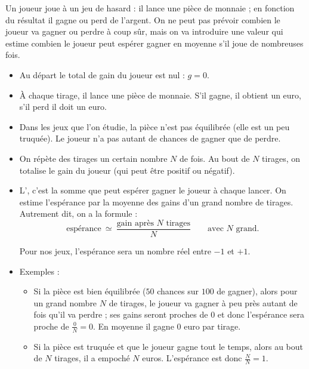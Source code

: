 \documentclass[11pt,class=report,crop=false]{standalone}
\begin{document}
\begin{cours}


Un joueur joue à un jeu de hasard : il lance une pièce de monnaie ; en fonction du résultat il gagne ou perd de l'argent. On ne peut pas prévoir combien le joueur va gagner ou perdre à coup sûr, mais on va introduire une valeur qui estime combien le joueur peut espérer gagner en moyenne s'il joue de nombreuses fois.

\begin{itemize}
  \item Au départ le total de gain du joueur est nul : $g=0$.
  
  \item À chaque tirage, il lance une pièce de monnaie. S'il gagne, il obtient un euro, s'il perd il doit un euro.
  
  \item Dans les jeux que l'on étudie, la pièce n'est pas équilibrée (elle est un peu truquée). Le joueur n'a pas autant de chances de gagner que de perdre.
  
  \item On répète des tirages un certain nombre $N$ de fois. Au bout de $N$ tirages, on totalise le gain du joueur (qui peut être positif ou négatif).
  
  \item L', c'est la somme que peut espérer gagner le joueur à chaque lancer. On estime l’espérance par la moyenne des gains d'un grand nombre de tirages. Autrement dit, on a la formule :
   $$\text{espérance} \  \simeq \  \frac{\text{gain après $N$ tirages}}{N} \qquad \text{avec $N$ grand}.$$ 
   
   Pour nos jeux, l'espérance sera un nombre réel entre $-1$ et $+1$.
  
  \item Exemples :
  \begin{itemize}
    \item Si la pièce est bien équilibrée ($50$ chances sur $100$ de gagner),
    alors pour un grand nombre $N$ de tirages, le joueur va gagner à peu près autant de fois qu'il va perdre ; ses gains seront proches de $0$ et donc l'espérance sera proche de $\frac{0}{N} = 0$. En moyenne il gagne $0$ euro par tirage.
    
    \item Si la pièce est truquée et que le joueur gagne tout le temps, alors au bout de $N$ tirages, il a empoché $N$ euros. L'espérance est donc $\frac{N}{N}=1$.
    

\end{itemize}
\end{itemize}
\end{cours}
\end{document}

